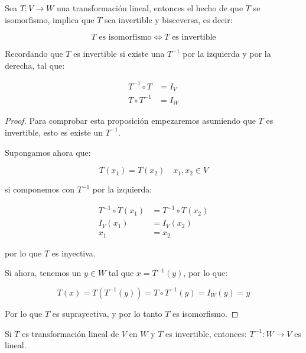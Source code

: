 		\begin{proposicion}
			Sea $T \colon V \to W$ una transformación lineal, entonces el hecho de que $T$ se isomorfismo, implica que $T$ sea invertible y bisceversa, es decir:

			\begin{equation}
				T \text{ es isomorfismo} \iff T \text{ es invertible}
			\end{equation}

			Recordando que $T$ es invertible si existe una $T^{-1}$ por la izquierda y por la derecha, tal que:

			\begin{align}
				T^{-1} \circ T &= I_V \nonumber \\
				T \circ T^{-1} &= I_W
			\end{align}
		\end{proposicion}

		\begin{proof}
			Para comprobar esta proposición empezaremos asumiendo que $T$ es invertible, esto es existe un $T^{-1}$.

			Supongamos ahora que:

			\begin{equation}
				T(x_1) = T(x_2) \quad x_1, x_2 \in V
			\end{equation}

			si componemos con $T^{-1}$ por la izquierda:

			\begin{align*}
				T^{-1} \circ T(x_1) &= T^{-1} \circ T(x_2) \\
				I_V(x_1) &= I_V(x_2) \\
				x_1 &= x_2
			\end{align*}

			por lo que $T$ es inyectiva.

			Si ahora, tenemos un $y \in W$ tal que $x = T^{-1}(y)$, por lo que:

			\begin{equation*}
				T(x) = T(T^{-1}(y)) = T \circ T^{-1}(y) = I_W(y) = y
			\end{equation*}

			Por lo que $T$ es suprayectiva, y por lo tanto $T$ es isomorfismo.
		\end{proof}

		\begin{proposicion}
			Si $T$ es transformación lineal de $V$ en $W$ y $T$ es invertible, entonces: $T^{-1} \colon W \to V$ es lineal.
		\end{proposicion}

